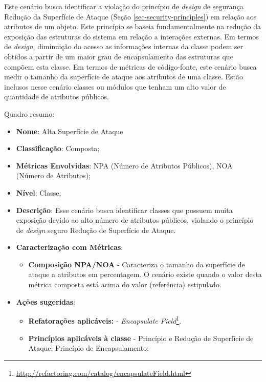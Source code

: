 Este cenário busca identificar a violação do princípio de \emph{design} de segurança Redução da Superfície de Ataque (Seção \ref{sec-security-principles}) em relação aos atributos de um objeto. 
%
Este princípio se baseia fundamentalmente na redução da exposição das estruturas do sistema em relação a interações externas. Em termos de \emph{design}, diminuição do acesso as informações internas da classe podem ser obtidos a partir de um maior grau de encapsulamento das estruturas que compõem esta classe. 
%
Em termos de métricas de código-fonte, este cenário busca medir o tamanho da superfície de ataque aos atributos de uma classe. Estão inclusos nesse cenário classes ou módulos que tenham um alto valor de quantidade de atributos públicos. 

%

Quadro resumo:

\begin{itemize}
\item \textbf{Nome}: Alta Superfície de Ataque
\item \textbf{Classificação}: Composta;
\item \textbf{Métricas Envolvidas}: NPA (Número de Atributos Públicos), NOA (Número de Atributos);
\item \textbf{Nível}: Classe;
\item \textbf{Descrição}: Esse cenário busca identificar classes que possuem muita exposição devido ao alto número de atributos públicos, violando o princípio de \emph{design} seguro Redução de Superfície de Ataque.
\item \textbf{Caracterização com Métricas}: 
	\begin{itemize}
	\item \textbf{Composição NPA/NOA} - Caracteriza o tamanho da superfície de ataque a atributos em percentagem. O cenário existe quando o valor desta métrica composta está acima do valor (referência) estipulado.
	\end{itemize}
\item \textbf{Ações sugeridas}:
	\begin{itemize}
	\item \textbf{Refatorações aplicáveis:} - \emph{Encapsulate Field}\footnote{\url{http://refactoring.com/catalog/encapsulateField.html}}.
	\item \textbf{Princípios aplicáveis à classe} - Princípio e Redução de Superfície de Ataque; Princípio de Encapsulamento;
	\end{itemize}
\end{itemize}

